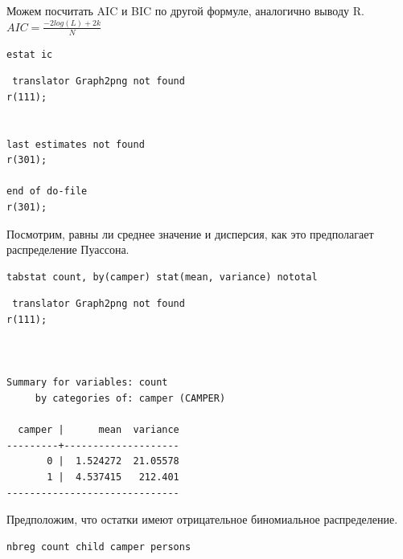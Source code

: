 \documentclass[]{book}
\begin{document}
Можем посчитать AIC и BIC по другой формуле, аналогично выводу R.
\(AIC = \frac {-2log(L) + 2k}{N}\)

\begin{verbatim}
estat ic
\end{verbatim}

\begin{verbatim}
 translator Graph2png not found
r(111);


last estimates not found
r(301);

end of do-file
r(301);
\end{verbatim}

Посмотрим, равны ли среднее значение и дисперсия, как это предполагает распределение Пуассона.

\begin{verbatim}
tabstat count, by(camper) stat(mean, variance) nototal
\end{verbatim}

\begin{verbatim}
 translator Graph2png not found
r(111);



Summary for variables: count
     by categories of: camper (CAMPER)

  camper |      mean  variance
---------+--------------------
       0 |  1.524272  21.05578
       1 |  4.537415   212.401
------------------------------
\end{verbatim}

Предположим, что остатки имеют отрицательное биномиальное распределение.

\begin{verbatim}
nbreg count child camper persons
\end{verbatim}
\end{document}
